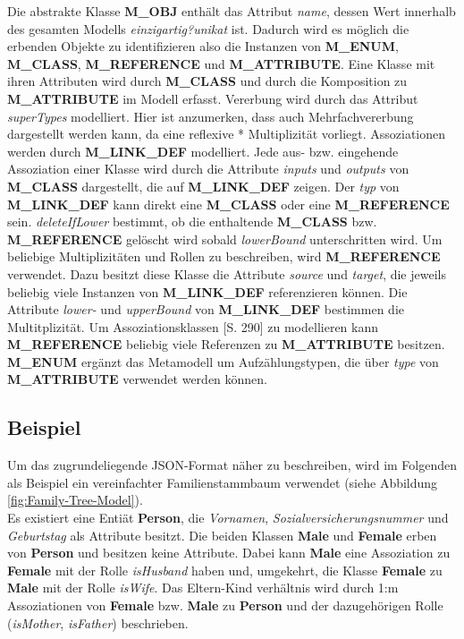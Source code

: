 Die abstrakte Klasse \textbf{M\_OBJ} enth\"alt das Attribut \textit{name}, dessen Wert innerhalb des gesamten Modells \textit{einzigartig?unikat} ist. Dadurch wird es m\"oglich die erbenden Objekte zu identifizieren also die Instanzen von \textbf{M\_ENUM}, \textbf{M\_CLASS}, \textbf{M\_REFERENCE} und \textbf{M\_ATTRIBUTE}.
Eine Klasse mit ihren Attributen wird durch \textbf{M\_CLASS} und durch die Komposition zu \textbf{M\_ATTRIBUTE} im Modell erfasst. Vererbung wird durch das Attribut \textit{superTypes} modelliert. Hier ist anzumerken, dass auch Mehrfachvererbung dargestellt werden kann, da eine reflexive * Multiplizität vorliegt. 
Assoziationen werden durch \textbf{M\_LINK\_DEF} modelliert. Jede aus- bzw. eingehende Assoziation einer Klasse wird durch die Attribute \textit{inputs} und \textit{outputs} von \textbf{M\_CLASS} dargestellt, die auf \textbf{M\_LINK\_DEF} zeigen. Der \textit{typ} von \textbf{M\_LINK\_DEF} kann direkt eine \textbf{M\_CLASS} oder eine \textbf{M\_REFERENCE} sein. \textit{deleteIfLower} bestimmt, ob die enthaltende \textbf{M\_CLASS} bzw. \textbf{M\_REFERENCE} gel\"oscht wird sobald \textit{lowerBound} unterschritten wird. Um beliebige Multiplizitäten und Rollen zu beschreiben, wird \textbf{M\_REFERENCE} verwendet. Dazu besitzt diese Klasse die Attribute \textit{source} und \textit{target}, die jeweils beliebig viele Instanzen von \textbf{M\_LINK\_DEF} referenzieren können. Die Attribute \textit{lower-} und \textit{upperBound} von \textbf{M\_LINK\_DEF} bestimmen die Multitplizität. Um Assoziationsklassen \cite{larman2005book}[S. 290] zu modellieren kann \textbf{M\_REF\-ER\-ENCE} beliebig viele Referenzen zu \textbf{M\_ATTRIBUTE} besitzen. \textbf{M\_ENUM} erg\"anzt das Metamodell um Aufz\"ahlungstypen, die \"uber \textit{type} von \textbf{M\_ATTRIBUTE} verwendet werden k\"onnen.

\subsection{Beispiel}\label{subsec:beispiel}
Um das zugrundeliegende JSON-Format n\"aher zu beschreiben, wird im Folgenden als Beispiel ein vereinfachter Familienstammbaum verwendet (siehe Abbildung \ref{fig:Family-Tree-Model}).\\ 
Es existiert eine Entiät \textbf{Person}, die \textit{Vornamen}, \textit{Sozialversicherungsnummer} und \textit{Geburtstag} als Attribute besitzt. Die beiden Klassen \textbf{Male} und \textbf{Female} erben von \textbf{Person} und besitzen keine Attribute. Dabei kann \textbf{Male} eine Assoziation zu \textbf{Female} mit der Rolle \textit{isHusband} haben und, umgekehrt, die Klasse \textbf{Female} zu \textbf{Male} mit der Rolle \textit{isWife}. Das Eltern-Kind verh\"altnis wird durch 1:m Assoziationen von \textbf{Female} bzw. \textbf{Male} zu \textbf{Person} und der dazugeh\"origen Rolle (\textit{isMother}, \textit{isFather}) beschrieben.

